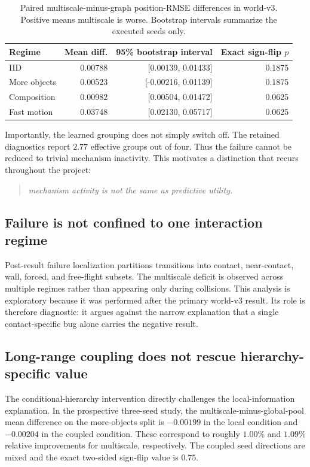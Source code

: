 \documentclass[10pt]{article}
\begin{document}
\begin{table}[t]
\centering
\caption{Paired multiscale-minus-graph position-RMSE differences in world-v3. Positive means multiscale is worse. Bootstrap intervals summarize the executed seeds only.}
\label{tab:paired}
\begin{tabular}{lrrr}
\toprule
Regime & Mean diff. & 95\% bootstrap interval & Exact sign-flip $p$\\
\midrule
IID & 0.00788 & [0.00139, 0.01433] & 0.1875\\
More objects & 0.00523 & [-0.00216, 0.01139] & 0.1875\\
Composition & 0.00982 & [0.00504, 0.01472] & 0.0625\\
Fast motion & 0.03748 & [0.02130, 0.05717] & 0.0625\\
\bottomrule
\end{tabular}
\end{table}

Importantly, the learned grouping does not simply switch off. The retained diagnostics report $2.77$ effective groups out of four. Thus the failure cannot be reduced to trivial mechanism inactivity. This motivates a distinction that recurs throughout the project:

\begin{quote}
\emph{mechanism activity is not the same as predictive utility.}
\end{quote}

\subsection{Failure is not confined to one interaction regime}

Post-result failure localization partitions transitions into contact, near-contact, wall, forced, and free-flight subsets. The multiscale deficit is observed across multiple regimes rather than appearing only during collisions. This analysis is exploratory because it was performed after the primary world-v3 result. Its role is therefore diagnostic: it argues against the narrow explanation that a single contact-specific bug alone carries the negative result.

\subsection{Long-range coupling does not rescue hierarchy-specific value}

The conditional-hierarchy intervention directly challenges the local-information explanation. In the prospective three-seed study, the multiscale-minus-global-pool mean difference on the more-objects split is $-0.00199$ in the local condition and $-0.00204$ in the coupled condition. These correspond to roughly $1.00\%$ and $1.09\%$ relative improvements for multiscale, respectively. The coupled seed directions are mixed and the exact two-sided sign-flip value is $0.75$.
\end{document}
